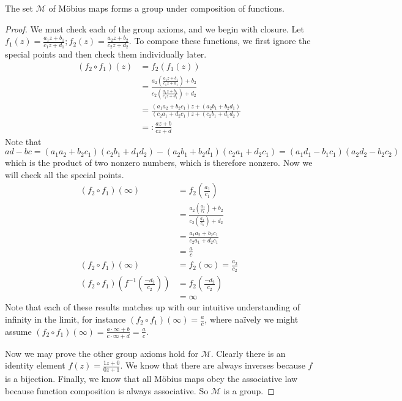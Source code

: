 \documentclass{article}
\begin{document}
	\begin{theorem}
		The set $\mathcal M$ of M\"obius maps forms a group under composition of functions.
	\end{theorem}
	\begin{proof}
		We must check each of the group axioms, and we begin with closure. Let $f_1(z) = \frac{a_1 z + b_1}{c_1 z + d_1}; f_2(z) = \frac{a_2 z + b_2}{c_2 z + d_2}$. To compose these functions, we first ignore the special points and then check them individually later.
		\begin{align*}
			(f_2 \circ f_1)(z) &= f_2(f_1(z)) \\
			&= \frac{a_2 \left( \frac{a_1 z + b_1}{c_1 z + d_1} \right) + b_2}{c_2 \left( \frac{a_1 z + b_1}{c_1 z + d_1} \right) + d_2} \\
			&= \frac{(a_1 a_2 + b_2 c_1)z + (a_2 b_1 + b_2 d_1)}{(c_2 a_1 + d_2 c_1)z + (c_2 b_1 + d_1 d_2)} \\
			&=: \frac{az + b}{cz + d}
		\end{align*}
		Note that $ad-bc = (a_1 a_2 + b_2 c_1)(c_2 b_1 + d_1 d_2) - (a_2 b_1 + b_2 d_1)(c_2 a_1 + d_2 c_1) = (a_1 d_1 - b_1 c_1)(a_2 d_2 - b_2 c_2)$ which is the product of two nonzero numbers, which is therefore nonzero. Now we will check all the special points.
		\begin{align*}
			(f_2 \circ f_1)(\infty) &= f_2\left(\frac{a_1}{c_1}\right) \\
			&= \frac{a_2 \left( \frac{a_1}{c_1} \right) + b_2}{c_2 \left( \frac{a_1}{c_1} \right) + d_2} \\
			&= \frac{a_1 a_2 + b_2 c_1}{c_2 a_1 + d_2 c_1} \\
			&= \frac{a}{c} \\
			(f_2 \circ f_1)(\infty) &= f_2(\infty) = \frac{a_2}{c_2} \\
			(f_2 \circ f_1)\left(f^{-1}\left(\frac{-d_2}{c_2}\right)\right) &= f_2\left( \frac{-d_2}{c_2} \right) \\
			&= \infty
		\end{align*}
		Note that each of these results matches up with our intuitive understanding of infinity in the limit, for instance $(f_2 \circ f_1)(\infty) = \frac{a}{c}$, where na\"ively we might assume $(f_2 \circ f_1)(\infty) = \frac{a \cdot \infty + b}{c \cdot \infty + d} = \frac{a}{c}$.

		Now we may prove the other group axioms hold for $\mathcal M$. Clearly there is an identity element $f(z) = \frac{1z + 0}{0z + 1}$. We know that there are always inverses because $f$ is a bijection. Finally, we know that all M\"obius maps obey the associative law because function composition is always associative. So $\mathcal M$ is a group.
	\end{proof}
\end{document}
